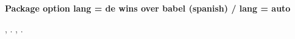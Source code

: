 \documentclass{article}
\newcommand\case[1]{\par\medskip\noindent\textbf{#1}\par\nopagebreak}
\begin{document}
\case{Package option lang = de wins over babel (spanish) / lang = auto}
, .
{, .}
\end{document}
